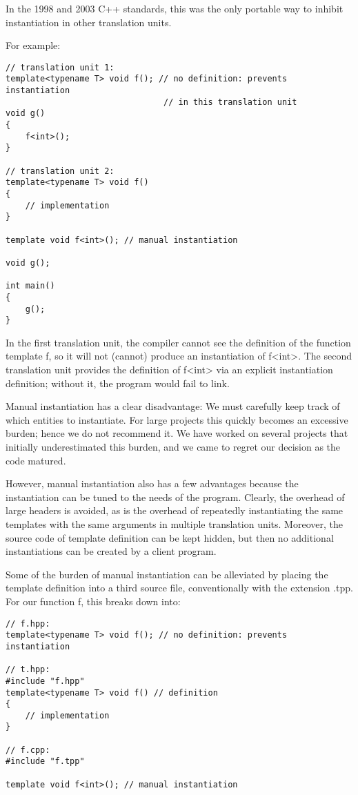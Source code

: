 \begin{tcolorbox}[colback=webgreen!5!white,colframe=webgreen!75!black]
\hspace*{0.75cm}In the 1998 and 2003 C++ standards, this was the only portable way to inhibit instantiation in other translation units.
\end{tcolorbox}

For example:

\begin{lstlisting}[style=styleCXX]
// translation unit 1:
template<typename T> void f(); // no definition: prevents instantiation
								// in this translation unit
void g()
{
	f<int>();
}

// translation unit 2:
template<typename T> void f()
{
	// implementation
}

template void f<int>(); // manual instantiation

void g();

int main()
{
	g();
}
\end{lstlisting}

In the first translation unit, the compiler cannot see the definition of the function template f, so it will not (cannot) produce an instantiation of f<int>. The second translation unit provides the definition of f<int> via an explicit instantiation definition; without it, the program would fail to link.

Manual instantiation has a clear disadvantage: We must carefully keep track of which entities to instantiate. For large projects this quickly becomes an excessive burden; hence we do not recommend it. We have worked on several projects that initially underestimated this burden, and we came to regret our decision as the code matured.

However, manual instantiation also has a few advantages because the instantiation can be tuned to the needs of the program. Clearly, the overhead of large headers is avoided, as is the overhead of repeatedly instantiating the same templates with the same arguments in multiple translation units. Moreover, the source code of template definition can be kept hidden, but then no additional instantiations can be created by a client program.

Some of the burden of manual instantiation can be alleviated by placing the template definition into a third source file, conventionally with the extension .tpp. For our function f, this breaks down into:

\begin{lstlisting}[style=styleCXX]
// f.hpp:
template<typename T> void f(); // no definition: prevents instantiation

// t.hpp:
#include "f.hpp"
template<typename T> void f() // definition
{
	// implementation
}

// f.cpp:
#include "f.tpp"

template void f<int>(); // manual instantiation
\end{lstlisting}

